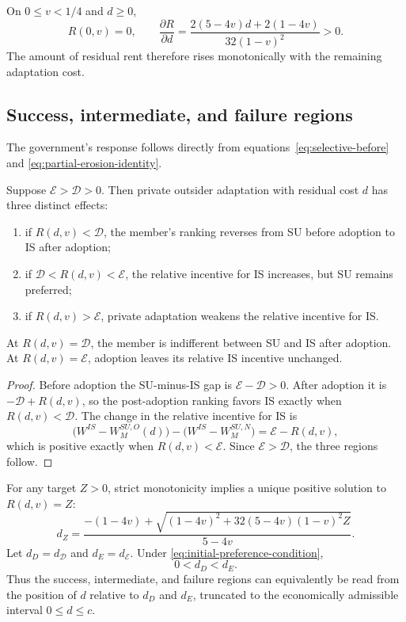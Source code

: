On $0\leq v<1/4$ and $d\geq0$,
\begin{equation}
    R(0,v)=0,
    \qquad
    \frac{\partial R}{\partial d}
    =
    \frac{2(5-4v)d+2(1-4v)}
         {32(1-v)^2}>0.
    \label{eq:residual-rent-monotonicity}
\end{equation}
The amount of residual rent therefore rises monotonically with the remaining adaptation cost.

\subsection{Success, intermediate, and failure regions}
\label{subsec:residual-rent-regions}

The government's response follows directly from equations~\eqref{eq:selective-before} and \eqref{eq:partial-erosion-identity}.

\begin{proposition}
\label{thm:selective-erosion}
Suppose $\mathscr E>\mathscr D>0$. Then private outsider adaptation with residual cost $d$ has three distinct effects:
\begin{enumerate}
    \item if $R(d,v)<\mathscr D$, the member's ranking reverses from SU before adoption to IS after adoption;
    \item if $\mathscr D<R(d,v)<\mathscr E$, the relative incentive for IS increases, but SU remains preferred;
    \item if $R(d,v)>\mathscr E$, private adaptation weakens the relative incentive for IS.
\end{enumerate}
At $R(d,v)=\mathscr D$, the member is indifferent between SU and IS after adoption. At $R(d,v)=\mathscr E$, adoption leaves its relative IS incentive unchanged.
\end{proposition}

\begin{proof}
Before adoption the SU-minus-IS gap is $\mathscr E-\mathscr D>0$. After adoption it is $-\mathscr D+R(d,v)$, so the post-adoption ranking favors IS exactly when $R(d,v)<\mathscr D$. The change in the relative incentive for IS is
\[
\bigl(W^{IS}-W_M^{SU,O}(d)\bigr)
-
\bigl(W^{IS}-W_M^{SU,N}\bigr)
=
\mathscr E-R(d,v),
\]
which is positive exactly when $R(d,v)<\mathscr E$. Since $\mathscr E>\mathscr D$, the three regions follow.
\end{proof}

For any target $Z>0$, strict monotonicity implies a unique positive solution to $R(d,v)=Z$:
\begin{equation}
    d_Z
    =
    \frac{
      -(1-4v)+
      \sqrt{(1-4v)^2+32(5-4v)(1-v)^2Z}
    }{5-4v}.
    \label{eq:residual-cost-threshold}
\end{equation}
Let $d_D=d_{\mathscr D}$ and $d_E=d_{\mathscr E}$. Under \eqref{eq:initial-preference-condition},
\[
0<d_D<d_E.
\]
Thus the success, intermediate, and failure regions can equivalently be read from the position of $d$ relative to $d_D$ and $d_E$, truncated to the economically admissible interval $0\leq d\leq c$.

